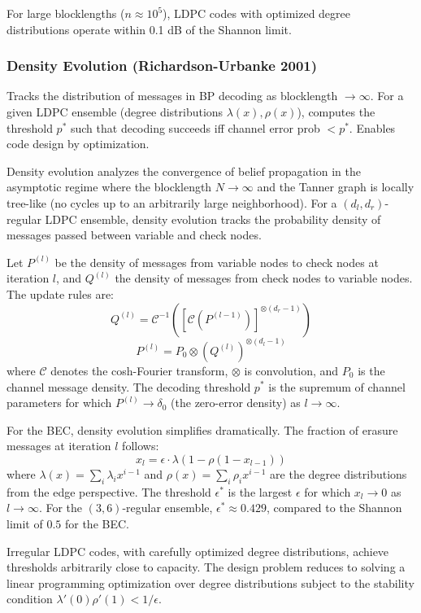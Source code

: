 \begin{example}
For large blocklengths ($n \approx 10^5$), LDPC codes with optimized degree distributions operate within 0.1 dB of the Shannon limit.
\end{example}

\subsubsection*{Density Evolution (Richardson-Urbanke 2001)}
Tracks the distribution of messages in BP decoding as blocklength $\to \infty$. For a given LDPC ensemble (degree distributions $\lambda(x), \rho(x)$), computes the threshold $p^*$ such that decoding succeeds iff channel error prob $< p^*$. Enables code design by optimization.

Density evolution analyzes the convergence of belief propagation in the asymptotic regime where the blocklength $N \to \infty$ and the Tanner graph is locally tree-like (no cycles up to an arbitrarily large neighborhood). For a $(d_l, d_r)$-regular LDPC ensemble, density evolution tracks the probability density of messages passed between variable and check nodes.

Let $P^{(l)}$ be the density of messages from variable nodes to check nodes at iteration $l$, and $Q^{(l)}$ the density of messages from check nodes to variable nodes. The update rules are:
\[
Q^{(l)} = \mathcal{C}^{-1}\left( \left[ \mathcal{C}(P^{(l-1)}) \right]^{\otimes (d_r - 1)} \right)
\]
\[
P^{(l)} = P_0 \otimes \left( Q^{(l)} \right)^{\otimes (d_l - 1)}
\]
where $\mathcal{C}$ denotes the cosh-Fourier transform, $\otimes$ is convolution, and $P_0$ is the channel message density. The decoding threshold $p^*$ is the supremum of channel parameters for which $P^{(l)} \to \delta_0$ (the zero-error density) as $l \to \infty$.

For the BEC, density evolution simplifies dramatically. The fraction of erasure messages at iteration $l$ follows:
\[
x_{l} = \epsilon \cdot \lambda(1 - \rho(1 - x_{l-1}))
\]
where $\lambda(x) = \sum_i \lambda_i x^{i-1}$ and $\rho(x) = \sum_i \rho_i x^{i-1}$ are the degree distributions from the edge perspective. The threshold $\epsilon^*$ is the largest $\epsilon$ for which $x_l \to 0$ as $l \to \infty$. For the $(3,6)$-regular ensemble, $\epsilon^* \approx 0.429$, compared to the Shannon limit of $0.5$ for the BEC.

Irregular LDPC codes, with carefully optimized degree distributions, achieve thresholds arbitrarily close to capacity. The design problem reduces to solving a linear programming optimization over degree distributions subject to the stability condition $\lambda'(0)\rho'(1) < 1/\epsilon$.

